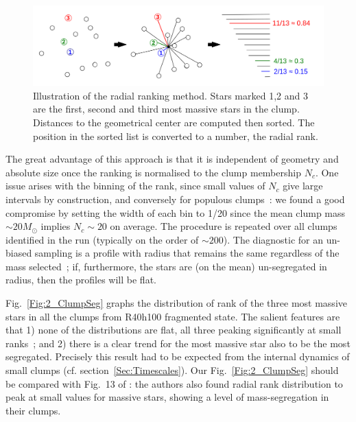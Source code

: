 \begin{figure}
\begin{center}
\includegraphics[width=\textwidth]{Figures/2_radial_ranking_schema}
\caption{Illustration of the radial ranking method. Stars marked 1,2 and 3 are the first, second and third most massive stars in the clump. Distances to the geometrical center are computed then sorted. The position in the sorted list is converted to a number, the radial rank.}
\label{Fig:2_radial_ranking}
\end{center}
\end{figure}

The great advantage of this approach is that it is independent of geometry and absolute size once the ranking is normalised to the clump membership $N_c$.  One issue arises with the binning of the rank, since small values of $N_c$ give large intervals by construction, and conversely for populous clumps~: we found a good compromise by setting the width of each bin to 1/20 since the mean clump mass $\sim 20 M_\odot$ implies $N_c \sim 20$ on average. The procedure is repeated over all clumps identified in the run (typically on the order of $\sim 200$). The diagnostic for an un-biased sampling is a profile with radius that remains the same regardless of the mass selected~; if, furthermore, the stars are (on the mean) un-segregated in radius, then the profiles will be flat. 


Fig.~\ref{Fig:2_ClumpSeg} graphs the  distribution of rank of the three most massive stars in all the clumps from R40h100 fragmented state. The salient features are that 1) none of the distributions are flat, all three peaking significantly  at small ranks~; and 2) there is a clear trend for the most massive star also to be the most  segregated. Precisely this result had to be expected from the internal dynamics of small clumps (cf. section~\ref{Sec:Timescales}).  Our Fig.~\ref{Fig:2_ClumpSeg} should be compared with Fig.~13 of \cite{Maschberger2010}: the authors also found radial rank distribution to peak at small values for massive stars, showing a level of mass-segregation in their clumps.

